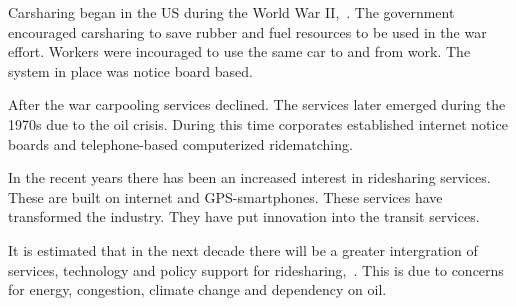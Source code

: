 Carsharing began in the US during the World War II,~\cite{Ferguson1997}. The government encouraged carsharing to save rubber and fuel resources to be used in the war effort. Workers were incouraged to use the same car to and from work. The system in place was notice board based.

After the war carpooling services declined. The services later emerged during the 1970s due to the oil crisis. During this time corporates established internet notice boards and telephone-based computerized ridematching.

In the recent years there has been an increased interest in ridesharing services. These are built on internet and GPS-smartphones. These services have transformed the industry. They have put innovation into the transit services.

It is estimated that in the next decade there will be a greater intergration of services, technology and policy support for ridesharing,~\cite{Chan2012}. This is due to concerns for energy, congestion, climate change and dependency on oil.
